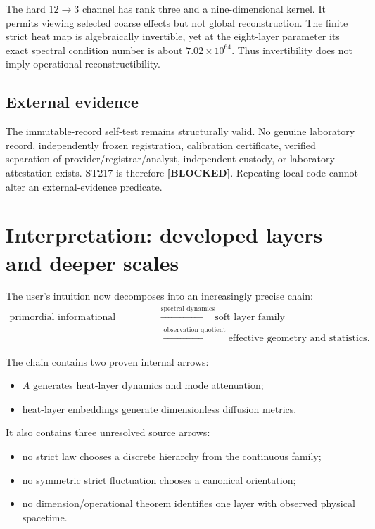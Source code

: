 \documentclass[11pt,a4paper]{article}
\newcommand{\blocked}{\textcolor{orange!82!black}{\textbf{[BLOCKED]}}}
\begin{document}
The hard $12\to3$ channel has rank three and a nine-dimensional kernel. It permits viewing selected coarse effects but not global reconstruction. The finite strict heat map is algebraically invertible, yet at the eight-layer parameter its exact spectral condition number is about $7.02\times10^{64}$. Thus invertibility does not imply operational reconstructibility.

\subsection{External evidence}

The immutable-record self-test remains structurally valid. No genuine laboratory record, independently frozen registration, calibration certificate, verified separation of provider/registrar/analyst, independent custody, or laboratory attestation exists. ST217 is therefore \blocked{}. Repeating local code cannot alter an external-evidence predicate.

\section{Interpretation: developed layers and deeper scales}

The user's intuition now decomposes into an increasingly precise chain:
\[
\begin{aligned}
\text{primordial informational nadsoliton}
&\xrightarrow{\text{spectral dynamics}}\text{soft layer family}\\
&\xrightarrow{\text{observation quotient}}\text{effective geometry and statistics}.
\end{aligned}
\]

The chain contains two proven internal arrows:
\begin{itemize}
\item $A$ generates heat-layer dynamics and mode attenuation;
\item heat-layer embeddings generate dimensionless diffusion metrics.
\end{itemize}

It also contains three unresolved source arrows:
\begin{itemize}
\item no strict law chooses a discrete hierarchy from the continuous family;
\item no symmetric strict fluctuation chooses a canonical orientation;
\item no dimension/operational theorem identifies one layer with observed physical spacetime.
\end{itemize}
\end{document}
